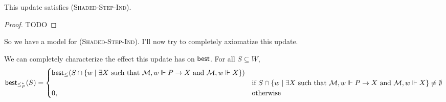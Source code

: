 \documentclass[letterpaper]{article}
\begin{document}
\begin{theorem}
    This update satisfies \textsc{(Shaded-Step-Ind)}.
\end{theorem}
\begin{proof}
    TODO
\end{proof}

So we have a model for \textsc{(Shaded-Step-Ind)}.  I'll now try to completely axiomatize this update.

\begin{proposition}
    We can completely characterize the effect this update has on $\mathsf{best}$.  For all $S \subseteq W$,
    \[
        \mathsf{best}_{\leq^\star_P}(S) =
        \begin{cases}
             \mathsf{best}_\leq(S \cap \{ w \mid \exists X \mbox{ such that } \mathcal{M}, w \Vdash P \to X \mbox{ and } \mathcal{M}, w \Vdash X \}) & \\
             & \text{if } S \cap \{ w \mid \exists X \mbox{ such that } \mathcal{M}, w \Vdash P \to X \mbox{ and } \mathcal{M}, w \Vdash X \} \ne \emptyset\\
            0,              & \text{otherwise}
        \end{cases}
    \]
\end{proposition}


\printbibliography
\end{document}
